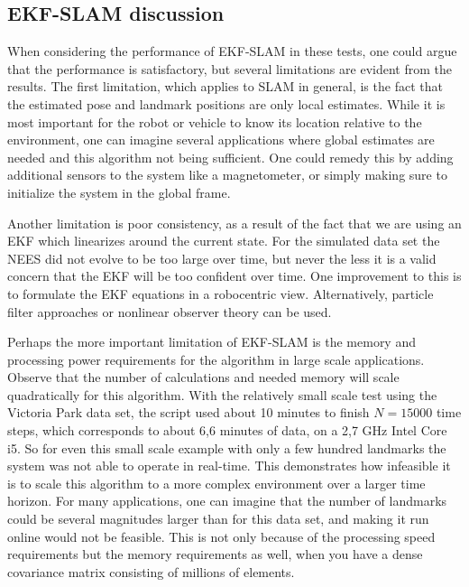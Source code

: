 
\subsection{EKF-SLAM discussion}

When considering the performance of EKF-SLAM in these tests, one could argue that the performance is satisfactory, but several limitations are evident from the results. The first limitation, which applies to SLAM in general, is the fact that the estimated pose and landmark positions are only local estimates. While it is most important for the robot or vehicle to know its location relative to the environment, one can imagine several applications where global estimates are needed and this algorithm not being sufficient. One could remedy this by adding additional sensors to the system like a magnetometer, or simply making sure to initialize the system in the global frame. 

Another limitation is poor consistency, as a result of the fact that we are using an EKF which linearizes around the current state. For the simulated data set the NEES did not evolve to be too large over time, but never the less it is a valid concern that the EKF will be too confident over time\cite{ekfslam}. One improvement to this is to formulate the EKF equations in a robocentric view. Alternatively, particle filter approaches or nonlinear observer theory can be used. 

Perhaps the more important limitation of EKF-SLAM is the memory and processing power requirements for the algorithm in large scale applications. Observe that the number of calculations and needed memory will scale quadratically for this algorithm. With the relatively small scale test using the Victoria Park data set, the script used about 10 minutes to finish $N=15000$ time steps, which corresponds to about 6,6 minutes of data, on a 2,7 GHz Intel Core i5. So for even this small scale example with only a few hundred landmarks the system was not able to operate in real-time. This demonstrates how infeasible it is to scale this algorithm to a more complex environment over a larger time horizon. For many applications, one can imagine that the number of landmarks could be several magnitudes larger than for this data set, and making it run online would not be feasible. This is not only because of the processing speed requirements but the memory requirements as well, when you have a dense covariance matrix consisting of millions of elements.

